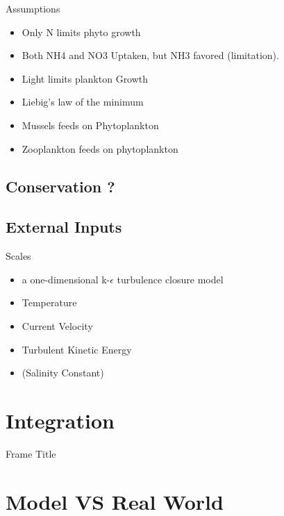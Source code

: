 \documentclass[final,xcolor=dvipsnames]{beamer}
\begin{document}
\begin{frame}
\begin{exampleblock}{Assumptions}
\begin{itemize}
    \item Only N limits phyto growth
    \item Both NH4 and NO3 Uptaken, but NH3 favored (limitation).
    \item Light limits plankton Growth  
    \item Liebig's law of the minimum
    \item Mussels feeds on Phytoplankton
    \item Zooplankton feeds on phytoplankton
\end{itemize} 
\end{exampleblock}
\end{frame}

\subsection{Conservation ?}

\subsection{External Inputs}
\begin{frame}

\begin{exampleblock}{Scales}
\begin{itemize}
    \item a one-dimensional k-$\epsilon$ turbulence closure model 
    \item Temperature
    \item Current Velocity
    \item Turbulent Kinetic Energy
    \item (Salinity Constant)
\end{itemize} 
\end{exampleblock}
\end{frame}



\section{Integration}
\begin{frame}{Frame Title}
    
\end{frame}


\section{Model VS Real World}
\end{document}
